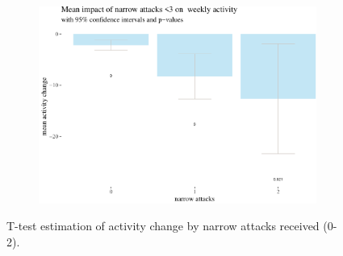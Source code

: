 \documentclass[10pt,]{scrartcl}
\begin{document}
\begin{figure}[h!]
\begin{subfigure}[t]{0.95\textwidth}

\begin{center}\includegraphics[width=1\linewidth]{redditAnalysisWalkthrough_files/figure-latex/unnamed-chunk-30-1} \end{center}
\end{subfigure}
\caption{T-test estimation of activity change by narrow attacks received (0-2).}
\label{fig:highbar3}
\end{figure}
\end{document}
